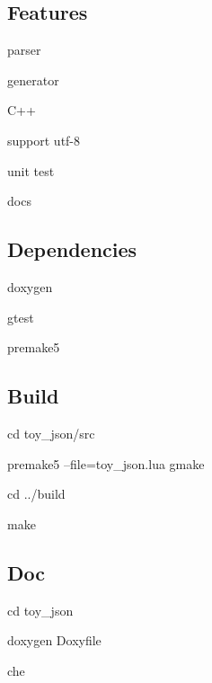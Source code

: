 \subsection*{Features}


\begin{DoxyItemize}
\item parser
\item generator
\item C++
\item support utf-\/8
\item unit test
\item docs
\end{DoxyItemize}

\subsection*{Dependencies}


\begin{DoxyItemize}
\item doxygen
\item gtest
\item premake5
\end{DoxyItemize}

\subsection*{Build}


\begin{DoxyEnumerate}
\item cd toy\+\_\+json/src
\item premake5 --file=toy\+\_\+json.\+lua gmake
\item cd ../build
\item make
\end{DoxyEnumerate}

\subsection*{Doc}


\begin{DoxyEnumerate}
\item cd toy\+\_\+json
\item doxygen Doxyfile
\item che 
\end{DoxyEnumerate}
